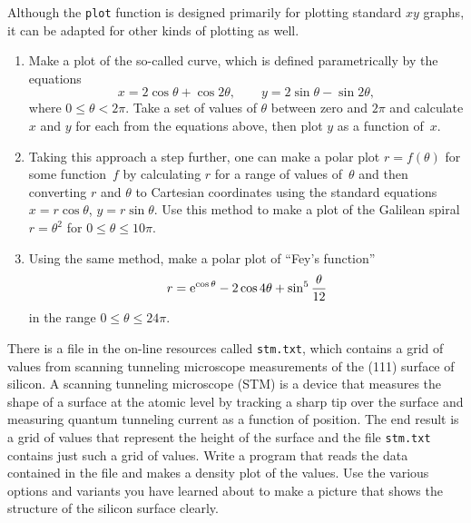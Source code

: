 \documentclass[12pt]{article}
\begin{document}
\begin{exercises}
\exskip Although the \verb|plot| function is designed primarily for
plotting standard $xy$ graphs, it can be adapted for other kinds of
plotting as well.
\begin{enumerate}\setlength{\itemsep}{0pt}
\item Make a plot of the so-called  curve, which is
  defined parametrically by the equations
\begin{displaymath}
x = 2 \cos \theta + \cos 2\theta, \qquad
y = 2 \sin \theta - \sin 2\theta,
\end{displaymath}
where $0\le\theta<2\pi$.  Take a set of values of $\theta$ between zero
and $2\pi$ and calculate $x$ and $y$ for each from the equations above,
then plot $y$ as a function of~$x$.
\item Taking this approach a step further, one can make a polar
  plot $r=f(\theta)$ for some function~$f$ by calculating $r$ for a range
  of values of~$\theta$ and then converting $r$ and $\theta$ to Cartesian
  coordinates using the standard equations $x = r\cos\theta$, $y =
  r\sin\theta$.  Use this method to make a plot of the Galilean
  spiral $r = \theta^2$ for $0\le\theta\le10\pi$.
\item Using the same method, make a polar plot of ``Fey's
  function''
\begin{displaymath}
r = \mathrm{e}^{\cos\theta} - 2 \cos 4\theta + \sin^5 \frac{\theta}{12}
\end{displaymath}
in the range $0\le\theta\le24\pi$.
\end{enumerate}



\exercise There is a file in the on-line resources called \verb|stm.txt|,
which contains a grid of values from scanning tunneling microscope
measurements of the (111) surface of silicon.  A scanning tunneling
microscope (STM) is a device that measures the shape of a surface at the
atomic level by tracking a sharp tip over the surface and measuring quantum
tunneling current as a function of position.  The end result is a grid of
values that represent the height of the surface and the file \verb|stm.txt|
contains just such a grid of values.  Write a program that reads the data
contained in the file and makes a density plot of the values.  Use
the various options and variants you have learned about to make a picture
that shows the structure of the silicon surface clearly.




\end{exercises}
\end{document}
